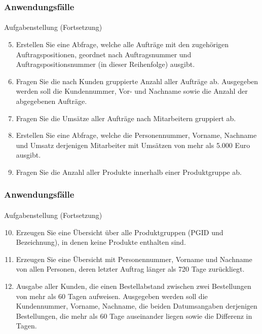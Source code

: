 \begin{frame}[t]
\frametitle{Anwendungsf\"alle}
\framesubtitle{\insertsubsection}
\begin{alertblock}{Aufgabenstellung (Fortsetzung)}
	\begin{enumerate}
		\setcounter{enumi}{4}
		\item\label{A1} Erstellen Sie eine Abfrage, welche alle Aufträge mit den zugehörigen Auftragspositionen, geordnet nach
		Auftragsnummer und Auftragspositionsnummer (in dieser Reihenfolge) ausgibt.
		\item\label{A2} Fragen Sie die nach Kunden gruppierte Anzahl aller Aufträge ab. Ausgegeben
		werden soll die Kundennummer, Vor- und Nachname sowie die Anzahl der abgegebenen Aufträge.
		\item\label{A3} Fragen Sie die Umsätze aller Aufträge nach Mitarbeitern gruppiert ab.
		\item\label{A4} Erstellen Sie eine Abfrage, welche die Personennummer, Vorname, Nachname und Umsatz derjenigen Mitarbeiter 
		mit Umsätzen von mehr als 5.000 Euro ausgibt.
		\item\label{A5} Fragen Sie die Anzahl aller Produkte innerhalb einer Produktgruppe ab.
	\end{enumerate}
\end{alertblock}
\end{frame}

\begin{frame}[t]
\frametitle{Anwendungsf\"alle}
\framesubtitle{\insertsubsection}
  \begin{alertblock}{Aufgabenstellung (Fortsetzung)}
		\begin{enumerate}
			\setcounter{enumi}{9}
			\item\label{A6} Erzeugen Sie eine Übersicht über alle Produktgruppen (PGID und Bezeichnung), in denen keine Produkte enthalten sind.					
			\item\label{A7} Erzeugen Sie eine Übersicht mit Personennummer, Vorname und Nachname von allen Personen, deren letzter Auftrag länger als 720 Tage zurückliegt.
			\item\label{A8} Ausgabe aller Kunden, die einen Bestellabstand zwischen zwei Bestellungen von mehr als 60 Tagen aufweisen. Ausgegeben werden soll
			 die Kundennummer, Vorname, Nachname, die beiden Datumsangaben derjenigen Bestellungen, die mehr als 60 Tage auseinander liegen sowie
			 die Differenz in Tagen.
		\end{enumerate}
	\end{alertblock}
\end{frame}

